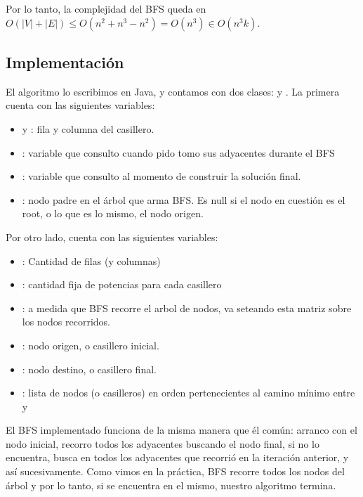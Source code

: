 Por lo tanto, la complejidad del BFS queda en $O(|V| + |E|) \leq O(n^2 + n^3 - n^2) = O(n^3) \in O(n^3 k)$. 

\subsection{Implementaci\'on}

El algoritmo lo escribimos en Java, y contamos con dos clases:  y . La primera cuenta con las siguientes variables: 

\begin{itemize}
 \item {} y : fila y columna del casillero.
 \item {}: variable que consulto cuando pido tomo sus adyacentes durante el BFS
 \item {}: variable que consulto al momento de construir la soluci\'on final. 
 \item {}: nodo padre en el \'arbol que arma BFS. Es null si el nodo en cuesti\'on es el root, o lo que es lo mismo, el nodo origen. 
\end{itemize}

Por otro lado,  cuenta con las siguientes variables: 

\begin{itemize}
 \item {}: Cantidad de filas (y columnas)
 \item {}: cantidad fija de potencias para cada casillero
 \item {}: a medida que BFS recorre el arbol de nodos, va seteando esta matriz sobre los nodos recorridos. 
 \item {}: nodo origen, o casillero inicial. 
 \item {}: nodo destino, o casillero final. 
 \item {}: lista de nodos (o casilleros) en orden pertenecientes al camino m\'inimo entre  y 
\end{itemize}

El BFS implementado funciona de la misma manera que \'el com\'un: arranco con el nodo inicial, recorro todos los adyacentes buscando el nodo final, si no lo encuentra, busca en todos los adyacentes que recorri\'o en la iteraci\'on anterior, y as\'i sucesivamente. Como vimos en la pr\'actica, BFS recorre todos los nodos del \'arbol y por lo tanto, si  se encuentra en el mismo, nuestro algoritmo termina. 

